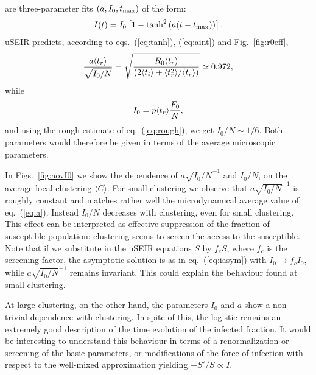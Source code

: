 \documentclass[10pt,letterpaper]{article}
\begin{document}
are three-parameter fits $(a, I_0, t_{\rm max})$ of the form:
\begin{eqnarray}
I(t)= I_0 \left[ 1 - {\rm tanh}^2 \left(a (t-t_{\rm max}) \right)\right].
\label{eq:iasym}
\end{eqnarray}
uSEIR predicts, according to eqs.~(\ref{eq:tanh}),  (\ref{eq:aint}) and Fig.~\ref{fig:r0eff},
\begin{eqnarray}
{a \langle t_r\rangle \over \sqrt{{I_0/N}}} = \sqrt{{ R_0 \langle t_r\rangle \over  \left(2 \langle t_i\rangle + \langle t_r^2\rangle/\langle t_r\rangle\right)}} \simeq 0.972,
\end{eqnarray}
while 
\begin{eqnarray}
 I_0 =  p \langle t_r\rangle {F_0\over N},
 \end{eqnarray}
 and using the rough estimate of eq.~(\ref{eq:rough}), we get $I_0/N \sim 1/6$. 
 Both parameters would therefore be given in terms of the average microscopic parameters. 


 In Figs.~\ref{fig:aovI0} we show the dependence of
$a \sqrt{I_0/N}^{-1}$ and $I_0/N$, on the average local clustering $\langle C \rangle$. For small clustering we observe that $a \sqrt{I_0/N}^{-1}$ is roughly constant and  matches rather well the microdynamical average value of eq.~(\ref{eq:a}). Instead $I_0/N$ decreases with clustering, even for small clustering. This effect can be interpreted as effective suppression of the fraction of susceptible population: clustering seems to screen the access to the susceptible. Note that if we substitute in the uSEIR equations $S$ by $f_c S$, where $f_c$ is the screening factor, the asymptotic solution is as in eq.~(\ref{eq:iasym})
with $I_0 \rightarrow f_c I_0$, while $a \sqrt{I_0/N}^{-1}$ remains invariant. This could explain the behaviour found at small clustering. 

At large clustering, on the other hand, the parameters $I_0$ and $a$ show a non-trivial dependence with clustering. In spite of this, the logistic remains an extremely good description of the time evolution of the infected fraction. It would be interesting to understand this behaviour in terms of a renormalization or screening of the basic parameters, 
or modifications of the force of infection with respect to the well-mixed approximation yielding
$-S'/S \propto I$.
\end{document}
